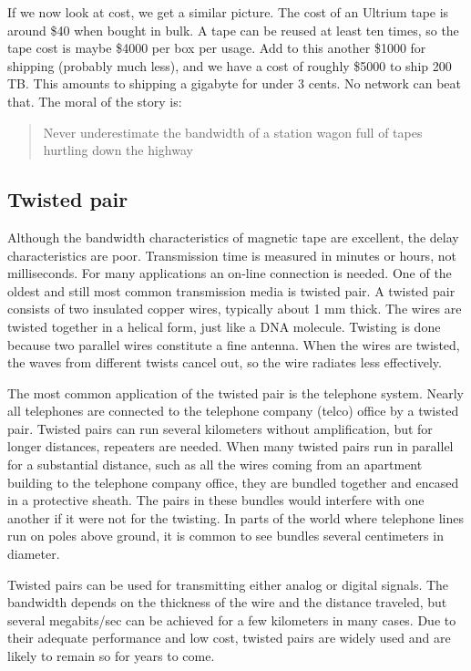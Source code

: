 If we now look at cost, we get a similar picture. The cost of an Ultrium
tape is around \$40 when bought in bulk. A tape can be reused at least
ten times, so the tape cost is maybe \$4000 per box per usage. Add to
this another \$1000 for shipping (probably much less), and we have a
cost of roughly \$5000 to ship 200 TB. This amounts to shipping a
gigabyte for under 3 cents. No network can beat that. The moral of the
story is:

\begin{quote}
{Never underestimate the bandwidth of a station wagon full of tapes
hurtling down the highway}
\end{quote}

\protect\hypertarget{0130661023_ch02lev1sec2.htmlux5cux23ch02lev2sec5}{}{}

\subsection{Twisted pair}

Although the bandwidth characteristics of magnetic tape are excellent,
the delay characteristics are poor. Transmission time is measured in
minutes or hours, not milliseconds. For many applications an on-line
connection is needed. One of the oldest and still most common
transmission media is {twisted pair}. A twisted pair consists of two
insulated copper wires, typically about 1 mm thick. The wires are
twisted together in a helical form, just like a DNA molecule. Twisting
is done because two parallel wires constitute a fine antenna. When the
wires are twisted, the waves from different twists cancel out, so the
wire radiates less effectively.

The most common application of the twisted pair is the telephone system.
Nearly all telephones are connected to the telephone company (telco)
office by a twisted pair. Twisted pairs can run several kilometers
without amplification, but for longer distances, repeaters are needed.
When many twisted pairs run in parallel for a substantial distance, such
as all the wires coming from an apartment building to the telephone
company office, they are bundled together and encased in a protective
sheath. The pairs in these bundles would interfere with one another if
it were not for the twisting. In parts of the world where telephone
lines run on poles above ground, it is common to see bundles several
centimeters in diameter.

Twisted pairs can be used for transmitting either analog or digital
signals. The bandwidth depends on the thickness of the wire and the
distance traveled, but several megabits/sec can be achieved for a few
kilometers in many cases. Due to their adequate performance and low
cost, twisted pairs are widely used and are likely to remain so for
years to come.

